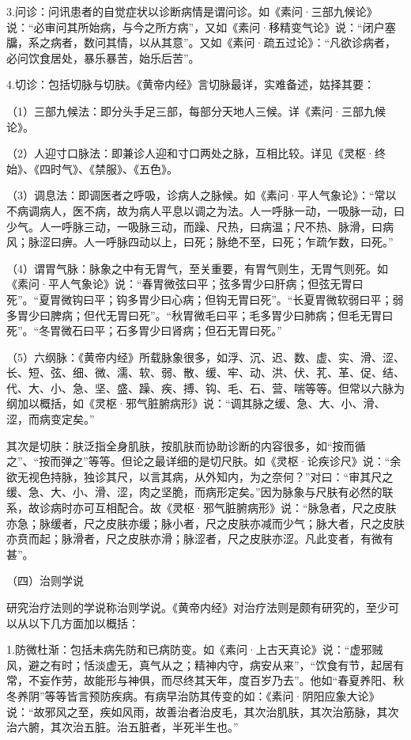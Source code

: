 \documentclass[a4paper,12pt,UTF8,twoside]{ctexbook}
\begin{document}
3.问诊：问讯患者的自觉症状以诊断病情是谓问诊。如《素问·三部九候论》说：“必审问其所始病，与今之所方病”，又如《素问·移精变气论》说：“闭户塞牖，系之病者，数问其情，以从其意”。又如《素问·疏五过论》：“凡欲诊病者，必问饮食居处，暴乐暴苦，始乐后苦”。

4.切诊：包括切脉与切肤。《黄帝内经》言切脉最详，实难备述，姑择其要：

（1）三部九候法：即分头手足三部，每部分天地人三候。详《素问·三部九候论》。

（2）人迎寸口脉法：即兼诊人迎和寸口两处之脉，互相比较。详见《灵枢·终始》、《四时气》、《禁服》、《五色》。

（3）调息法：即调医者之呼吸，诊病人之脉候。如《素问·平人气象论》：“常以不病调病人，医不病，故为病人平息以调之为法。人一呼脉一动，一吸脉一动，曰少气。人一呼脉三动，一吸脉三动，而躁、尺热，曰病温；尺不热、脉滑，曰病风；脉涩曰痹。人一呼脉四动以上，曰死；脉绝不至，曰死；乍疏乍数，曰死。”

（4）谓胃气脉：脉象之中有无胃气，至关重要，有胃气则生，无胃气则死。如《素问·平人气象论》说：“春胃微弦曰平；弦多胃少曰肝病；但弦无胃曰死”。“夏胃微钩曰平；钩多胃少曰心病；但钩无胃曰死”。“长夏胃微软弱曰平；弱多胃少曰脾病；但代无胃曰死”。“秋胃微毛曰平；毛多胃少曰肺病；但毛无胃曰死”。“冬胃微石曰平；石多胃少曰肾病；但石无胃曰死。”

（5）六纲脉：《黄帝内经》所载脉象很多，如浮、沉、迟、数、虚、实、滑、涩、长、短、弦、细、微、濡、软、弱、散、缓、牢、动、洪、伏、芤、革、促、结、代、大、小、急、坚、盛、躁、疾、搏、钩、毛、石、营、喘等等。但常以六脉为纲加以概括，如《灵枢·邪气脏腑病形》说：“调其脉之缓、急、大、小、滑、涩，而病变定矣。”

其次是切肤：肤泛指全身肌肤，按肌肤而协助诊断的内容很多，如“按而循之”、“按而弹之”等等。但论之最详细的是切尺肤。如《灵枢·论疾诊尺》说：“余欲无视色持脉，独诊其尺，以言其病，从外知内，为之奈何？”对曰：“审其尺之缓、急、大、小、滑、涩，肉之坚脆，而病形定矣。”因为脉象与尺肤有必然的联系，故诊病时亦可互相配合。故《灵枢·邪气脏腑病形》说：“脉急者，尺之皮肤亦急；脉缓者，尺之皮肤亦缓；脉小者，尺之皮肤亦减而少气；脉大者，尺之皮肤亦贲而起；脉滑者，尺之皮肤亦滑；脉涩者，尺之皮肤亦涩。凡此变者，有微有甚”。

（四）治则学说

研究治疗法则的学说称治则学说。《黄帝内经》对治疗法则是颇有研究的，至少可以从以下几方面加以概括：

1.防微杜渐：包括未病先防和已病防变。如《素问·上古天真论》说：“虚邪贼风，避之有时；恬淡虚无，真气从之；精神内守，病安从来”，“饮食有节，起居有常，不妄作劳，故能形与神俱，而尽终其天年，度百岁乃去”。他如“春夏养阳、秋冬养阴”等等皆言预防疾病。有病早治防其传变的如：《素问·阴阳应象大论》说：“故邪风之至，疾如风雨，故善治者治皮毛，其次治肌肤，其次治筋脉，其次治六腑，其次治五脏。治五脏者，半死半生也。”
\end{document}
